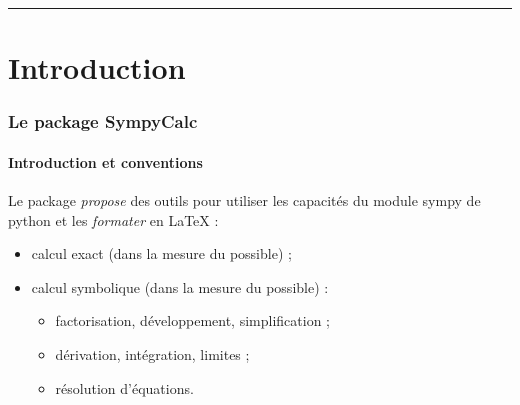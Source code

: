 \documentclass[french,a4paper,11pt]{article}
\begin{document}
\hrule

\medskip

\newpage

\hypertarget{matoc}{}

\tableofcontents

\newpage

\part{Introduction}

\section{Le package SympyCalc}

\subsection{Introduction et conventions}

\begin{noteblock}
Le package \textit{propose} des outils pour utiliser les capacités du module \textsf{sympy} de \textsf{python} et les \textit{formater} en \LaTeX{} :

\begin{itemize}
	\item calcul exact (dans la mesure du possible) ;
	\item calcul symbolique (dans la mesure du possible) :
	\begin{itemize}
		\item factorisation, développement, simplification ;
		\item dérivation, intégration, limites ;
		\item résolution d'équations.
	\end{itemize}
\end{itemize}
\vspace*{-\baselineskip}\leavevmode
\end{noteblock}
\end{document}

